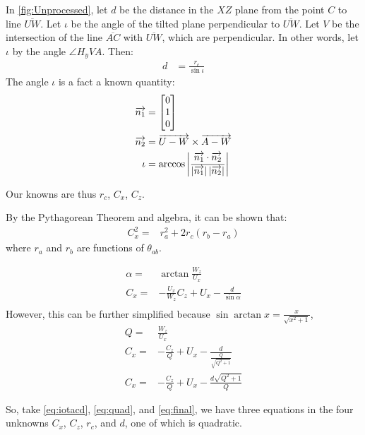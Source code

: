 \documentclass{article}
\begin{document}
In \ref{fig:Unprocessed}, let $d$ be the distance in the $XZ$ plane from
the point $C$ to line $\overline{UW}$.
Let $\iota$ be the angle of the tilted plane perpendicular to $\overline{UW}$.
Let $V$ be the intersection of the line $\overline{AC}$ with $\overline{UW}$,
which are perpendicular.
In other words, let $\iota$ by the angle $\angle{H_yVA}$.
Then:
\begin{align}
d &= \frac{r_c}{\sin{\iota}} \label{eq:iotacd}
\end{align}
The angle $\iota$ is a fact a known quantity:
\begin{align}
\overrightarrow{n_1} &= \begin{bmatrix}
    0 \\
    1 \\
    0
\end{bmatrix} \\
\overrightarrow{n_2} &= \overrightarrow{U - W}  \times \overrightarrow{A - W} \\
\iota &= \arccos{ \left\lvert\frac{\overrightarrow{n_1} \cdot \overrightarrow{n_2}}
  { \left\lvert\overrightarrow{n_1}\right\rvert  \left\lvert\overrightarrow{n_2}\right\rvert}\right\rvert} \\
\end{align}

Our knowns are thus $r_c$, $C_x$, $C_z$.

By the Pythagorean Theorem and algebra, it can be shown that:
\begin{align}
C_x^2 =& r_a^2 + 2r_c(r_b - r_a) \label{eq:quad}
\end{align}
where $r_a$ and $r_b$ are functions of $\theta_{ab}$.



\begin{align}
  \alpha =& \arctan{\frac{W_z}{U_x}} \\
  C_x =& -\frac{U_x}{W_z}C_z + U_x - \frac{d}{\sin{\alpha}} \\
\end{align}
However, this can be further simplified because $\sin{\arctan{x}} = \frac{x}{\sqrt{x^2+1}}$,
\begin{align}
  Q =& \frac{W_z}{U_x} \\
  C_x =& -\frac{C_z}{Q} + U_x - \frac{d}{\frac{Q}{\sqrt{Q^2+1}}} \\
  C_x =& -\frac{C_z}{Q} + U_x - \frac{d \sqrt{Q^2+1}}{Q} \label{eq:final}
\end{align}

So, take \ref{eq:iotacd}, \ref{eq:quad}, and \ref{eq:final}, we have three equations
in the four unknowns $C_x$, $C_z$, $r_c$, and $d$, one of which is quadratic.
\end{document}
